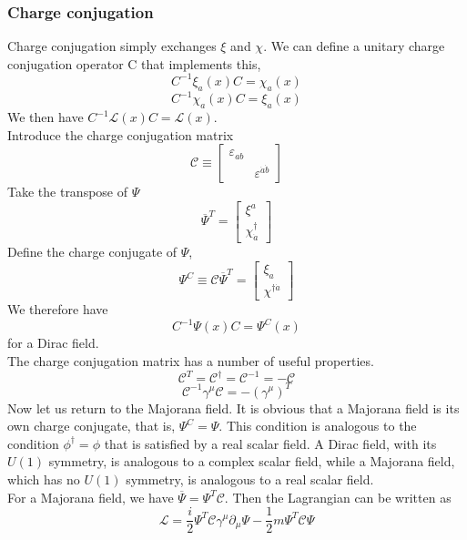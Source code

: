 \documentclass[cyan]{elegantnote}
\begin{document}
\subsubsection{Charge conjugation}
\noindent
Charge conjugation simply exchanges $\xi$ and $\chi$. We can define a unitary charge conjugation operator C that implements this,
\[C^{-1}\xi_a(x)C = \chi_a(x)\]
\[C^{-1}\chi_a(x)C = \xi_a(x)\]
We then have $C^{-1}\mathcal{L}(x)C = \mathcal{L}(x)$.\\
Introduce the charge conjugation matrix
\[\mathcal{C} \equiv \left[ \begin{matrix} \varepsilon_{ab}& \\ & \varepsilon ^{\dot{a}\dot{b}}\end{matrix} \right]\]
Take the transpose of $\Psi$
\[\overline{\Psi}^T = \left[ \begin{matrix} \xi^a\\ \chi_{\dot{a}}^{\dagger}\end{matrix} \right] \]
Define the charge conjugate of $\Psi$,
\[\Psi^C \equiv \mathcal{C}\overline{\Psi}^T = \left[ \begin{matrix} \xi_a\\ \chi^{\dagger \dot{a}}\end{matrix} \right] \]
We therefore have
\[C^{-1}\Psi(x)C = \Psi^C(x)\]
for a Dirac field.\\
The charge conjugation matrix has a number of useful properties.
\[\mathcal{C}^T = \mathcal{C}^{\dagger} = \mathcal{C}^{-1} = -\mathcal{C}\]
\[\mathcal{C}^{-1} \gamma^{\mu} \mathcal{C} = - (\gamma^{\mu})^T\]
Now let us return to the Majorana field. It is obvious that a Majorana field is its own charge conjugate, that is, $\Psi^C = \Psi$. This condition is analogous to the condition $\phi^{\dagger} = \phi$ that is satisfied by a real scalar field. A Dirac field, with its $U(1)$ symmetry, is analogous to a complex scalar field, while a Majorana field, which has no $U(1)$ symmetry, is analogous to a real scalar field.\\
For a Majorana field, we have $\overline{\Psi} = \Psi^T \mathcal{C}$. Then the Lagrangian can be written as
\[\mathcal{L} = \frac{i}{2} \Psi^T \mathcal{C} \gamma^{\mu} \partial_{\mu} \Psi - \frac{1}{2}m \Psi^T \mathcal{C} \Psi\]
\end{document}
